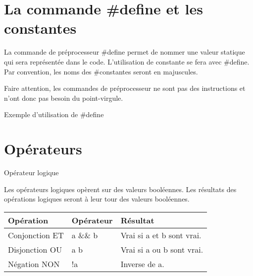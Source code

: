 \hypertarget{la-commande-define-et-les-constantes}{%
\section{La commande \#define et les
constantes}\label{la-commande-define-et-les-constantes}}

\begin{frame}{}
\protect\hypertarget{section}{}

La commande de préprocesseur \#define permet de nommer une valeur
statique qui sera représentée dans le code. L'utilisation de constante
se fera avec \#define. Par convention, les noms des \#constantes seront
en majuscules.

Faire attention, les commandes de préprocesseur ne sont pas des
instructions et n'ont donc pas besoin du point-virgule.

\end{frame}

\begin{frame}[fragile]{Exemple d'utilisation de \#define}
\protect\hypertarget{exemple-dutilisation-de-define}{}

\begin{Shaded}
\end{Shaded}


\end{frame}

\hypertarget{opuxe9rateurs}{%
\section{Opérateurs}\label{opuxe9rateurs}}

\begin{frame}{Opérateur logique}
\protect\hypertarget{opuxe9rateur-logique}{}

Les opérateurs logiques opèrent sur des valeurs booléennes. Les
résultats des opérations logiques seront à leur tour des valeurs
booléennes.

\begin{longtable}[]{@{}lll@{}}
\toprule
Opération & Opérateur & Résultat\tabularnewline
\midrule
\endhead
Conjonction ET & a \&\& b & Vrai si a et b sont vrai.\tabularnewline
Disjonction OU & a \textbar{}\textbar{} b & Vrai si a ou b sont
vrai.\tabularnewline
Négation NON & !a & Inverse de a.\tabularnewline
\bottomrule
\end{longtable}

\end{frame}

